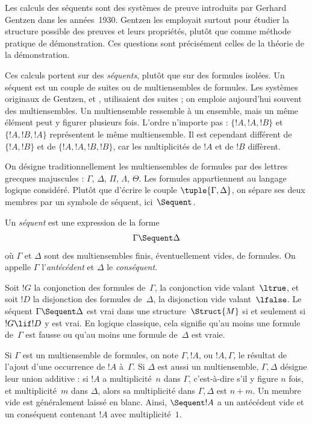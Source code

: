 \documentclass[../../../include/open-logic-section]{subfiles}
\begin{document}


Les calculs des séquents sont des systèmes de preuve
introduits par Gerhard Gentzen dans les années~1930.
Gentzen les employait surtout pour étudier la structure
possible des preuves et leurs propriétés, plutôt que
comme méthode pratique de démonstration. Ces questions
sont précisément celles de la théorie de la démonstration.

Ces calculs portent sur des \emph{séquents}, plutôt
que sur des formules isolées. Un séquent est un couple
de suites ou de multiensembles de formules.
Les systèmes originaux de Gentzen,  et ,
utilisaient des suites ; on emploie aujourd'hui souvent
des multiensembles. Un multiensemble ressemble à un
ensemble, mais un même élément peut y figurer plusieurs
fois. L'ordre n'importe pas : $\{!A, !A, !B\}$ et
$\{!A, !B, !A\}$ représentent le même multiensemble.
Il est cependant différent de $\{!A, !B\}$ et
de $\{!A, !A, !B, !B\}$, car les multiplicités
de $!A$ et de $!B$ diffèrent.

On désigne traditionnellement les multiensembles
de formules par des lettres grecques majuscules :
$\Gamma$, $\Delta$, $\Pi$, $\Lambda$, $\Theta$.
Les formules appartiennent au langage logique
considéré. Plutôt que d'écrire le couple
$\tuple{\Gamma, \Delta}$, on sépare ses deux
membres par un symbole de séquent, ici~$\Sequent$.

\begin{defn}[Séquent]
Un \emph{séquent} est une expression de la forme
\[
\Gamma \Sequent \Delta
\]
où $\Gamma$ et $\Delta$ sont des multiensembles
finis, éventuellement vides, de formules.
On appelle $\Gamma$ l'\emph{antécédent}
et $\Delta$ le \emph{conséquent}.
\end{defn}

Soit $!G$ la conjonction des formules de~$\Gamma$,
la conjonction vide valant~$\ltrue$, et soit
$!D$ la disjonction des formules de~$\Delta$,
la disjonction vide valant~$\lfalse$.
Le séquent $\Gamma \Sequent \Delta$ est vrai
dans une structure~$\Struct{M}$ si et seulement
si $!G \lif !D$ y est vrai. En logique classique,
cela signifie qu'au moins une formule de~$\Gamma$
est fausse ou qu'au moins une formule de~$\Delta$
est vraie.

Si $\Gamma$ est un multiensemble de formules,
on note $\Gamma, !A$, ou $!A, \Gamma$, le
résultat de l'ajout d'une occurrence de $!A$
à~$\Gamma$. Si $\Delta$ est aussi un multiensemble,
$\Gamma, \Delta$ désigne leur union additive :
si $!A$ a multiplicité~$n$ dans $\Gamma$,
c'est-à-dire s'il y figure $n$ fois, et multiplicité~$m$
dans $\Delta$, alors sa multiplicité dans
$\Gamma, \Delta$ est $n+m$.
Un membre vide est généralement laissé en blanc.
Ainsi, $\Sequent !A$ a un antécédent vide
et un conséquent contenant $!A$ avec multiplicité~$1$.
\end{document}
